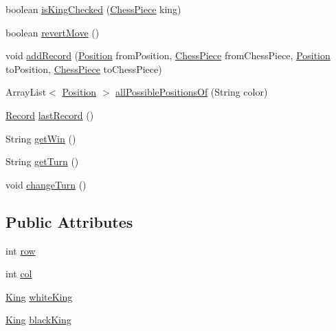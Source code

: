 \begin{DoxyCompactItemize}
\item 
boolean \hyperlink{classmodel_core_1_1_chess_board_a031a84fd458cb11464d0eadc6317b945}{is\+King\+Checked} (\hyperlink{classmodel_chess_pieces_1_1_chess_piece}{Chess\+Piece} king)
\item 
boolean \hyperlink{classmodel_core_1_1_chess_board_a76bee75817abc992f53aa7301f7085da}{revert\+Move} ()
\item 
void \hyperlink{classmodel_core_1_1_chess_board_af36430e89b73d56b322509621d8b27ee}{add\+Record} (\hyperlink{classmodel_core_1_1_position}{Position} from\+Position, \hyperlink{classmodel_chess_pieces_1_1_chess_piece}{Chess\+Piece} from\+Chess\+Piece, \hyperlink{classmodel_core_1_1_position}{Position} to\+Position, \hyperlink{classmodel_chess_pieces_1_1_chess_piece}{Chess\+Piece} to\+Chess\+Piece)
\item 
Array\+List$<$ \hyperlink{classmodel_core_1_1_position}{Position} $>$ \hyperlink{classmodel_core_1_1_chess_board_a9580196da2802e440d64b5d6f8d50bf1}{all\+Possible\+Positions\+Of} (String color)
\item 
\hyperlink{classmodel_core_1_1_record}{Record} \hyperlink{classmodel_core_1_1_chess_board_ae899ac8bc62aaf23e4724870932ac6bf}{last\+Record} ()
\item 
String \hyperlink{classmodel_core_1_1_chess_board_a34e37f076c55fdc46d66ac2dc0280267}{get\+Win} ()
\item 
String \hyperlink{classmodel_core_1_1_chess_board_a5bb013faa5e4f206f7812157fe7b4a8a}{get\+Turn} ()
\item 
void \hyperlink{classmodel_core_1_1_chess_board_afa802cdcbe4e30d37c1ba8b1b408fadd}{change\+Turn} ()
\end{DoxyCompactItemize}
\subsection*{Public Attributes}
\begin{DoxyCompactItemize}
\item 
int \hyperlink{classmodel_core_1_1_chess_board_a97b8b44a011e141557812f801be59fb3}{row}
\item 
int \hyperlink{classmodel_core_1_1_chess_board_ad7110bd9ee10396094cb5a58406bd04e}{col}
\item 
\hyperlink{classmodel_chess_pieces_1_1_king}{King} \hyperlink{classmodel_core_1_1_chess_board_ac35268604f4e0b6c5b0b1a454f71f6b6}{white\+King}
\item 
\hyperlink{classmodel_chess_pieces_1_1_king}{King} \hyperlink{classmodel_core_1_1_chess_board_a4a811ce68180a71f5fea55095c3ef0f5}{black\+King}
\end{DoxyCompactItemize}


